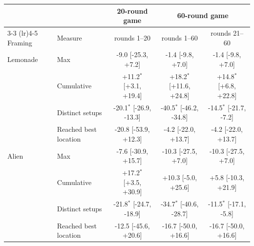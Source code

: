 \begin{tabular}{l l c cc}
\toprule
 & & 20-round game & \multicolumn{2}{c}{60-round game} \\
\cmidrule(lr){3-3} \cmidrule(lr){4-5}
Framing & Measure & rounds 1--20 & rounds 1--60 & rounds 21--60 \\
\midrule
Lemonade & Max & -9.0 [-25.3, +7.2] & -1.4 [-9.8, +7.0] & -1.4 [-9.8, +7.0] \\
 & Cumulative & +11.2$^{\ast}$ [+3.1, +19.4] & +18.2$^{\ast}$ [+11.6, +24.8] & +14.8$^{\ast}$ [+6.8, +22.8] \\
 & Distinct setups & -20.1$^{\ast}$ [-26.9, -13.3] & -40.5$^{\ast}$ [-46.2, -34.8] & -14.5$^{\ast}$ [-21.7, -7.2] \\
 & Reached best location & -20.8 [-53.9, +12.3] & -4.2 [-22.0, +13.7] & -4.2 [-22.0, +13.7] \\
\addlinespace
Alien & Max & -7.6 [-30.9, +15.7] & -10.3 [-27.5, +7.0] & -10.3 [-27.5, +7.0] \\
 & Cumulative & +17.2$^{\ast}$ [+3.5, +30.9] & +10.3 [-5.0, +25.6] & +5.8 [-10.3, +21.9] \\
 & Distinct setups & -21.8$^{\ast}$ [-24.7, -18.9] & -34.7$^{\ast}$ [-40.6, -28.7] & -11.5$^{\ast}$ [-17.1, -5.8] \\
 & Reached best location & -12.5 [-45.6, +20.6] & -16.7 [-50.0, +16.6] & -16.7 [-50.0, +16.6] \\
\bottomrule
\end{tabular}
